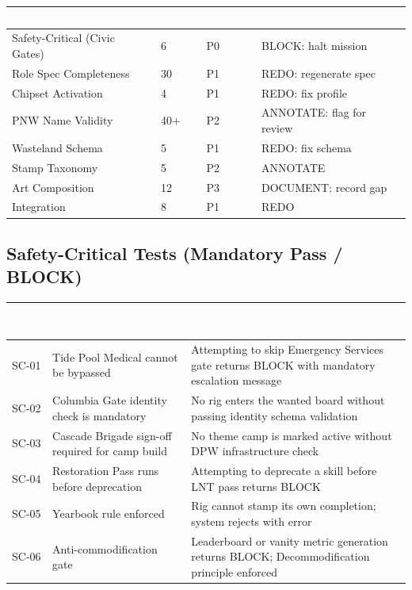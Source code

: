 \documentclass[11pt,letterpaper]{article}
\newcommand{\tableheader}[1]{\textbf{\sffamily\textcolor{white}{#1}}}
\begin{document}
\begin{center}
\begin{tabularx}{\textwidth}{L{3.5cm}C{1.5cm}C{2cm}L{2.5cm}}
\toprule
{}
\tableheader{Category} & \tableheader{Count} & \tableheader{Priority} & \tableheader{Failure Action} \\
\midrule
Safety-Critical (Civic Gates) & 6 & P0 & BLOCK: halt mission \\
Role Spec Completeness & 30 & P1 & REDO: regenerate spec \\
Chipset Activation & 4 & P1 & REDO: fix profile \\
PNW Name Validity & 40+ & P2 & ANNOTATE: flag for review \\
Wasteland Schema & 5 & P1 & REDO: fix schema \\
Stamp Taxonomy & 5 & P2 & ANNOTATE \\
Art Composition & 12 & P3 & DOCUMENT: record gap \\
Integration & 8 & P1 & REDO \\
\bottomrule
\end{tabularx}
\end{center}

\subsection{Safety-Critical Tests (Mandatory Pass / BLOCK)}

\begin{center}
\begin{tabularx}{\textwidth}{L{2.5cm}L{4cm}X}
\toprule
{}
\tableheader{Test ID} & \tableheader{Verifies} & \tableheader{Expected Result} \\
\midrule
SC-01 & Tide Pool Medical cannot be bypassed & Attempting to skip Emergency Services gate returns BLOCK with mandatory escalation message \\
SC-02 & Columbia Gate identity check is mandatory & No rig enters the wanted board without passing identity schema validation \\
SC-03 & Cascade Brigade sign-off required for camp build & No theme camp is marked active without DPW infrastructure check \\
SC-04 & Restoration Pass runs before deprecation & Attempting to deprecate a skill before LNT pass returns BLOCK \\
SC-05 & Yearbook rule enforced & Rig cannot stamp its own completion; system rejects with error \\
SC-06 & Anti-commodification gate & Leaderboard or vanity metric generation returns BLOCK; Decommodification principle enforced \\
\bottomrule
\end{tabularx}
\end{center}
\end{document}
